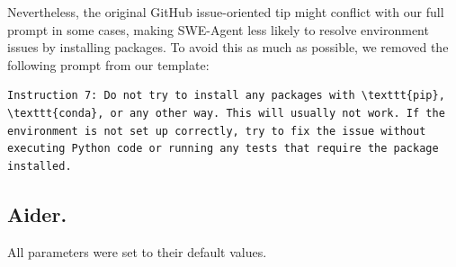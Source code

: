 Nevertheless, the original GitHub issue-oriented tip might conflict with our full prompt in some cases, making SWE-Agent less likely to resolve environment issues by installing packages. To avoid this as much as possible, we removed the following prompt from our template:
\begin{lstlisting}
Instruction 7: Do not try to install any packages with \texttt{pip}, \texttt{conda}, or any other way. This will usually not work. If the environment is not set up correctly, try to fix the issue without executing Python code or running any tests that require the package installed.
\end{lstlisting}

\subsection*{Aider.}
All parameters were set to their default values.


